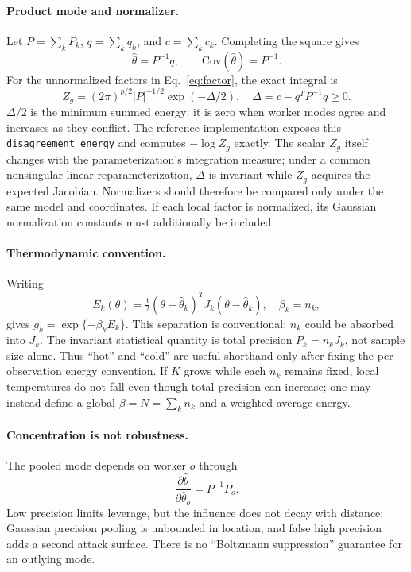 \paragraph{Product mode and normalizer.} Let $P=\sum_kP_k$, $q=\sum_kq_k$, and $c=\sum_kc_k$. Completing the square gives
\begin{equation}
\hat\theta=P^{-1}q,\qquad \mathrm{Cov}(\hat\theta)=P^{-1}.
\label{eq:pool}
\end{equation}
For the unnormalized factors in Eq.~\eqref{eq:factor}, the exact integral is
\begin{equation}
Z_g=(2\pi)^{p/2}|P|^{-1/2}\exp(-\Delta/2),
\quad \Delta=c-q^TP^{-1}q\ge0.
\label{eq:normalizer}
\end{equation}
$\Delta/2$ is the minimum summed energy: it is zero when worker modes agree and increases as they conflict. The reference implementation exposes this \texttt{disagreement\_energy} and computes $-\log Z_g$ exactly. The scalar $Z_g$ itself changes with the parameterization's integration measure; under a common nonsingular linear reparameterization, $\Delta$ is invariant while $Z_g$ acquires the expected Jacobian. Normalizers should therefore be compared only under the same model and coordinates. If each local factor is normalized, its Gaussian normalization constants must additionally be included.

\paragraph{Thermodynamic convention.} Writing
\begin{equation}
E_k(\theta)=\tfrac12(\theta-\hat\theta_k)^TJ_k(\theta-\hat\theta_k),
\quad \beta_k=n_k,
\label{eq:gibbs}
\end{equation}
gives $g_k=\exp\{-\beta_kE_k\}$. This separation is conventional: $n_k$ could be absorbed into $J_k$. The invariant statistical quantity is total precision $P_k=n_kJ_k$, not sample size alone. Thus ``hot'' and ``cold'' are useful shorthand only after fixing the per-observation energy convention. If $K$ grows while each $n_k$ remains fixed, local temperatures do not fall even though total precision can increase; one may instead define a global $\beta=N=\sum_kn_k$ and a weighted average energy.

\paragraph{Concentration is not robustness.} The pooled mode depends on worker $o$ through
\begin{equation}
\frac{\partial\hat\theta}{\partial\hat\theta_o}=P^{-1}P_o.
\label{eq:influence}
\end{equation}
Low precision limits leverage, but the influence does not decay with distance: Gaussian precision pooling is unbounded in location, and false high precision adds a second attack surface. There is no ``Boltzmann suppression'' guarantee for an outlying mode.


